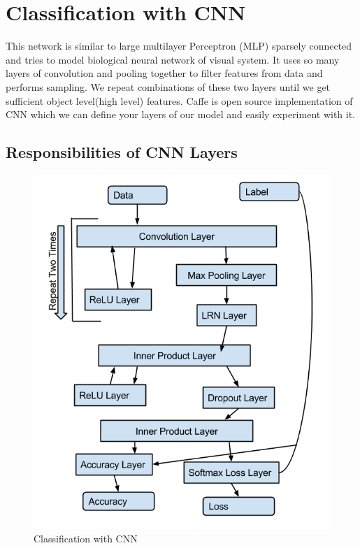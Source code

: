 \documentclass[11pt]{report}
\begin{document}
\section{Classification with CNN}

This network is similar to large multilayer Perceptron (MLP) sparsely connected and tries to model biological neural network of visual system. It uses so many layers of convolution  and pooling together to filter features from data and performs sampling. We repeat combinations of these two layers until we get sufficient object level(high level) features. 
Caffe \cite{jia2014caffe} is open source implementation of CNN which we can define your layers of our model and easily experiment with it.






\subsection{Responsibilities of CNN Layers}
\begin{figure}[h]
\centering

\includegraphics[scale=.7]{./images/cnn.png}

\caption{Classification with CNN}
\end{figure}
\end{document}
